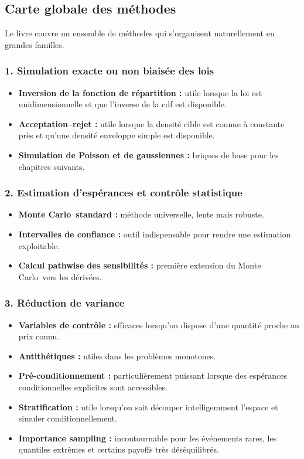 \documentclass[11pt,a4paper]{article}
\newcommand{\mc}{Monte Carlo}
\begin{document}
\subsection{Carte globale des méthodes}

Le livre couvre un ensemble de méthodes qui s'organisent naturellement en grandes familles.

\subsubsection*{1. Simulation exacte ou non biaisée des lois}

\begin{itemize}
  \item \textbf{Inversion de la fonction de répartition :} utile lorsque la loi est unidimensionnelle et que l'inverse de la cdf est disponible.
  \item \textbf{Acceptation--rejet :} utile lorsque la densité cible est connue à constante près et qu'une densité enveloppe simple est disponible.
  \item \textbf{Simulation de Poisson et de gaussiennes :} briques de base pour les chapitres suivants.
\end{itemize}

\subsubsection*{2. Estimation d'espérances et contrôle statistique}

\begin{itemize}
  \item \textbf{\mc\ standard :} méthode universelle, lente mais robuste.
  \item \textbf{Intervalles de confiance :} outil indispensable pour rendre une estimation exploitable.
  \item \textbf{Calcul pathwise des sensibilités :} première extension du \mc\ vers les dérivées.
\end{itemize}

\subsubsection*{3. Réduction de variance}

\begin{itemize}
  \item \textbf{Variables de contrôle :} efficaces lorsqu'on dispose d'une quantité proche au prix connu.
  \item \textbf{Antithétiques :} utiles dans les problèmes monotones.
  \item \textbf{Pré-conditionnement :} particulièrement puissant lorsque des espérances conditionnelles explicites sont accessibles.
  \item \textbf{Stratification :} utile lorsqu'on sait découper intelligemment l'espace et simuler conditionnellement.
  \item \textbf{Importance sampling :} incontournable pour les événements rares, les quantiles extrêmes et certains payoffs très déséquilibrés.
\end{itemize}
\end{document}
